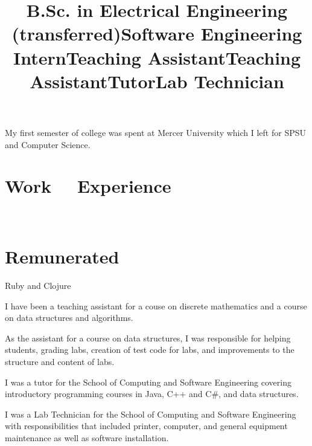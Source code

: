 \documentclass[margintitle,line]{res}
\renewcommand{\subsection}[1]{\section{\normalfont #1}}
\begin{document}
\begin{resume}
\title{B.Sc. in Electrical Engineering (transferred)}
\begin{position}
My first semester of college was spent at Mercer University which I left  for SPSU and Computer Science.
\end{position}


\section{Work \ \ Experience}
\ \\
\subsection{Remunerated}

\title{Software Engineering Intern}
\begin{position}
 Ruby and Clojure
\end{position}

\title{Teaching Assistant}
\begin{position}
 I have been a teaching assistant for a couse on discrete mathematics and a course on data structures and algorithms.
\end{position}

\title{Teaching Assistant}
\begin{position}
 As the assistant for a course on data structures, I was responsible for helping students, grading labs, creation of test code for labs, and improvements to the structure and content of labs.
\end{position}

\title{Tutor}
\begin{position}
I was a tutor for the School of Computing and Software Engineering covering introductory programming courses in Java, C++ and C\#, and data structures.
\end{position}

\title{Lab Technician}
\begin{position}
I was a Lab Technician  for the School of Computing and Software Engineering with responsibilities that included printer, computer, and general equipment maintenance as well as software installation.
\end{position}


\end{resume}
\end{document}
